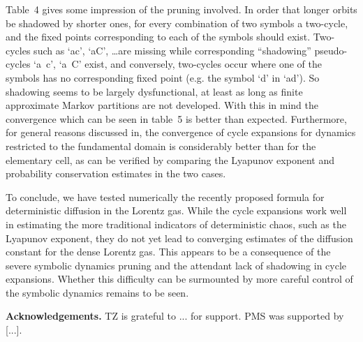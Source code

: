 \documentclass[pre,preprint,groupedaddress,showpacs,showkeys]{revtex4}
\begin{document}
Table~4 gives some impression of the pruning involved.
In order that longer orbits be shadowed by shorter ones,
for every combination of two symbols a two-cycle,
and the fixed points corresponding to each of the symbols should exist.
Two-cycles such as `ac', `aC', \ldots are missing while
corresponding ``shadowing'' pseudo-cycles `a~c', `a~C' exist, and
conversely, two-cycles occur where one of the symbols
has no corresponding fixed point
(e.g. the symbol `d' in `ad'). So shadowing seems to be largely dysfunctional,
at least as long as finite approximate Markov partitions are
not developed.
With this in mind the convergence which can be seen in table~5
is better than expected. Furthermore, for general reasons discussed
in, the convergence of cycle expansions for dynamics
restricted to the fundamental domain is considerably better
than for the elementary cell, as can be verified by comparing
the Lyapunov exponent and probability conservation estimates in
the two cases.


To conclude, we have tested numerically the recently proposed formula
for deterministic diffusion in the Lorentz gas.
While the cycle expansions work well in estimating
the more traditional indicators of deterministic chaos, such as
the Lyapunov exponent, they do not yet lead to converging estimates
of the diffusion constant for the dense Lorentz gas. This appears to
be a consequence of the severe symbolic dynamics pruning and the
attendant lack of shadowing in cycle expansions. Whether this difficulty
can be surmounted by more careful control of the symbolic dynamics
remains to be seen.

{\bf Acknowledgements.}
TZ is grateful to ... for support. PMS was supported by [...].

\newpage
\end{document}

